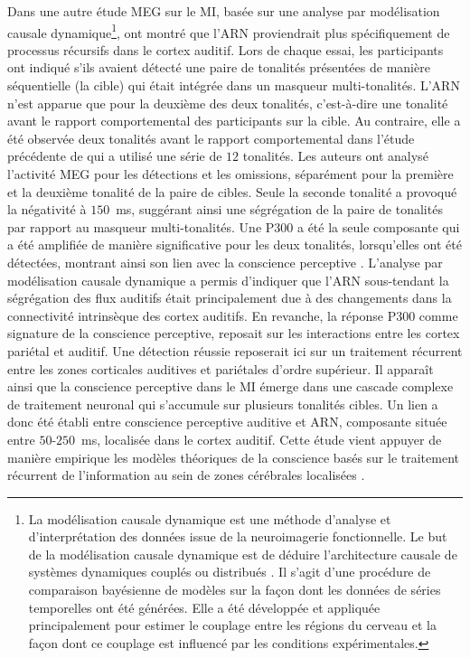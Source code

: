 Dans une autre étude MEG sur le MI, basée sur une analyse par modélisation causale dynamique\footnote{La modélisation causale dynamique est une méthode d'analyse et d'interprétation des données issue de la neuroimagerie fonctionnelle. 
Le but de la modélisation causale dynamique est de déduire l'architecture causale de systèmes dynamiques couplés ou distribués \citep{marreiros2010dynamic}. 
Il s'agit d'une procédure de comparaison bayésienne de modèles sur la façon dont les données de séries temporelles ont été générées. 
Elle a été développée et appliquée principalement pour estimer le couplage entre les régions du cerveau et la façon dont ce couplage est influencé par les conditions expérimentales.}, \cite{giani2015detecting} ont montré que l'ARN proviendrait plus spécifiquement de processus récursifs dans le cortex auditif. 
Lors de chaque essai, les participants ont indiqué s'ils avaient détecté une paire de tonalités présentées de manière séquentielle (la cible) qui était intégrée dans un masqueur multi-tonalités. 
L'ARN n'est apparue que pour la deuxième des deux tonalités, c'est-à-dire une tonalité avant le rapport comportemental des participants sur la cible. 
Au contraire, elle a été observée deux tonalités avant le rapport comportemental dans l'étude précédente de \cite{gutschalk2008neural} qui a utilisé une série de $12$ tonalités. 
Les auteurs ont analysé l'activité MEG pour les détections et les omissions, séparément pour la première et la deuxième tonalité de la paire de cibles. 
Seule la seconde tonalité a provoqué la négativité à $150$~ms, suggérant ainsi une ségrégation de la paire de tonalités par rapport au masqueur multi-tonalités. 
Une P300 a été la seule composante qui a été amplifiée de manière significative pour les deux tonalités, lorsqu'elles ont été détectées, montrant ainsi son lien avec la conscience perceptive \citep{giani2015detecting}. 
L'analyse par modélisation causale dynamique a permis d'indiquer que l'ARN sous-tendant la ségrégation des flux auditifs était principalement due à des changements dans la connectivité intrinsèque des cortex auditifs. 
En revanche, la réponse P300 comme signature de la conscience perceptive, reposait sur les interactions entre les cortex pariétal et auditif. 
Une détection réussie reposerait ici sur un traitement récurrent entre les zones corticales auditives et pariétales d'ordre supérieur. 
Il apparaît ainsi que la conscience perceptive dans le MI émerge dans une cascade complexe de traitement neuronal qui s'accumule sur plusieurs tonalités cibles. 
Un lien a donc été établi entre conscience perceptive auditive et ARN, composante située entre $50$-$250$~ms, localisée dans le cortex auditif. 
Cette étude vient appuyer de manière empirique les modèles théoriques de la conscience basés sur le traitement récurrent de l'information au sein de zones cérébrales localisées \citep{lamme2000distinct, lamme2003visual, lamme2006towards}. 

